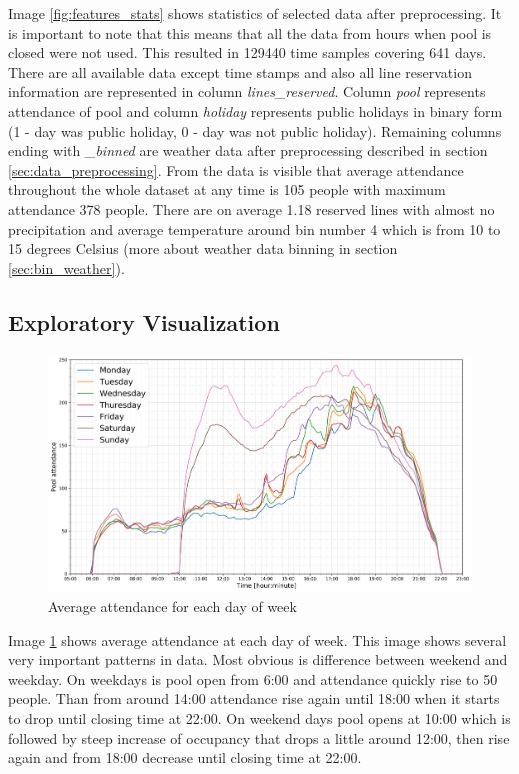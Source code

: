 \documentclass{article}
\begin{document}
Image \ref{fig:features_stats} shows statistics of selected data after preprocessing. It is important to note that this means that all the data from hours when pool is closed were not used. This resulted in 129440 time samples covering 641 days. There are all available data except time stamps and also all line reservation information are represented in column \emph{lines\_reserved}. Column \emph{pool} represents attendance of pool and column \emph{holiday} represents public holidays in binary form (1 - day was public holiday, 0 - day was not public holiday). Remaining columns ending with \emph{\_binned} are weather data after preprocessing described in section \ref{sec:data_preprocessing}. From the data is visible that average attendance throughout the whole dataset at any time is 105 people with maximum attendance 378 people. There are on average 1.18 reserved lines with almost no precipitation and average temperature around bin number 4 which is from 10 to 15 degrees Celsius (more about weather data binning in section \ref{sec:bin_weather}).

\subsection{Exploratory Visualization}
\begin{figure}[h!]
\centering
\includegraphics[width=13cm]{imgs/averages}
\caption{Average attendance for each day of week}
\label{fig:averages}
\end{figure}

Image \ref{fig:averages} shows average attendance at each day of week. This image shows several very important patterns in data. Most obvious is difference between weekend and weekday. On weekdays is pool open from 6:00 and attendance quickly rise to 50 people. Than from around 14:00 attendance rise again until 18:00 when it starts to drop until closing time at 22:00. On weekend days pool opens at 10:00 which is followed by steep increase of occupancy that drops a little around 12:00, then rise again and from 18:00 decrease until closing time at 22:00.
\end{document}
